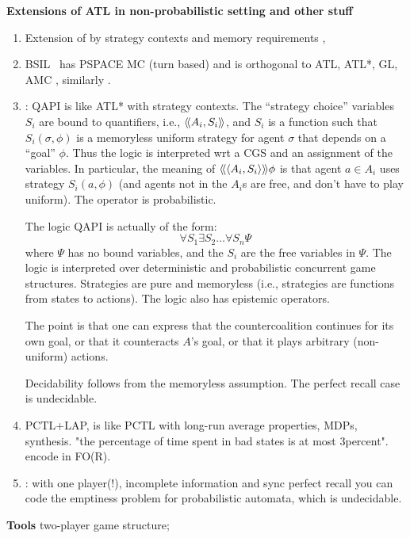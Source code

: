 \textbf{Extensions of ATL in non-probabilistic setting and other stuff}
\begin{enumerate}
\item  Extension of \ATL by strategy contexts and memory requirements \cite{DBLP:conf/lfcs/BrihayeLLM09}, 
\item BSIL~\cite{DBLP:conf/concur/WangHY11} has PSPACE MC (turn based) and is orthogonal to ATL, ATL*, GL, AMC , similarly \cite{DBLP:conf/tacas/HuangSW13}.
\item \cite{DBLP:conf/icaart/Schnoor13a}: QAPI is like ATL* with strategy contexts. The ``strategy choice'' variables $S_i$ are bound to quantifiers, i.e., $\atlE[A_i,S_i]$, and $S_i$ is a function such that $S_i(\sigma,\phi)$ is a memoryless uniform strategy for agent $\sigma$ that depends on a ``goal'' $\phi$. Thus the logic is interpreted wrt a CGS and an assignment of the variables. In particular, the meaning of $\atlE[\tpl{A_i,S_i}] \phi$ is that agent $a \in A_i$ uses strategy $S_i(a,\phi)$ (and agents not in the $A_i$s are free, and don't have to play uniform). The operator is probabilistic.

The logic QAPI is actually of the form:
\[
\forall S_1 \exists S_2 \dots \forall S_n \Psi
\] 
where $\Psi$ has no bound variables, and the $S_i$ are the free variables in $\Psi$.
The logic is interpreted over deterministic and probabilistic concurrent game structures. Strategies are pure and memoryless (i.e., strategies are functions from states to actions). The logic also has epistemic operators. 

The point is that one can express that the countercoalition continues for its own goal, or that it counteracts $A$'s goal, or that it plays arbitrary (non-uniform) actions.

Decidability follows from the memoryless assumption. The perfect recall case is undecidable.
\item \cite{DBLP:journals/fuin/KuceraS08} PCTL+LAP, is like  PCTL with long-run average properties, MDPs, synthesis. "the percentage of time spent in bad states is at most 3percent". encode in FO(R).


\item \cite{DBLP:conf/aaai/HuangSZ12}: with one player(!), incomplete information and sync perfect recall you can code the emptiness problem for probabilistic automata, which is undecidable.
\end{enumerate}


\textbf{Tools} \cite{DBLP:conf/lics/AlfaroH00} two-player game structure;


